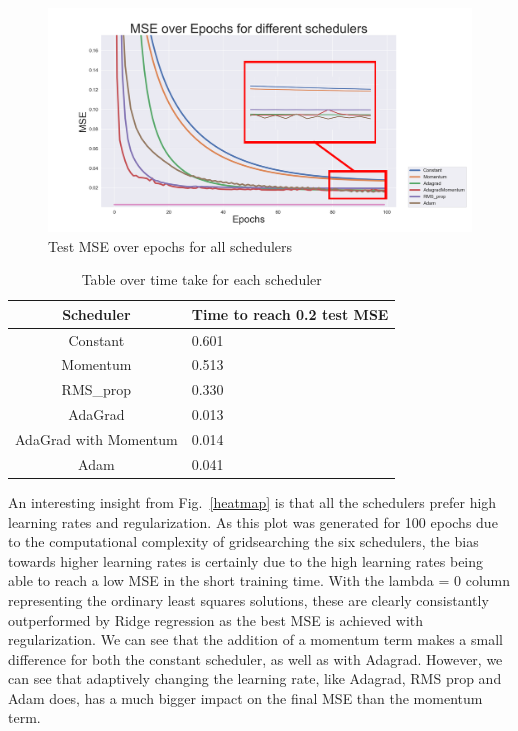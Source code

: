 \documentclass[onecolumn,10pt,cleanfoot]{asme2ej}
\begin{document}
\begin{figure}[H]
\centerline{\includegraphics[width=7in]{figure/new_adam_v_adagrad.png}}
\caption{Test MSE over epochs for all schedulers}
\label{figall}
\end{figure}

\begin{table}[H]
\caption{Table over time take for each scheduler}
\begin{center}
\label{timetable}
\begin{tabular}{| c | l |}
\hline
Scheduler & Time to reach 0.2 test MSE \\
\hline
Constant & 0.601 \\
Momentum & 0.513 \\
RMS\_prop & 0.330 \\
AdaGrad & 0.013 \\
AdaGrad with Momentum & 0.014 \\
Adam & 0.041 \\
\hline
\end{tabular}
\end{center}
\end{table}

An interesting insight from Fig.~\ref{heatmap} is that all the schedulers prefer high learning rates and regularization. As this plot was generated for 100 epochs due to the computational complexity of gridsearching the six schedulers, the bias towards higher learning rates is certainly due to the high learning rates being able to reach a low MSE in the short training time. With the lambda = 0 column representing the ordinary least squares solutions, these are clearly consistantly outperformed by Ridge regression as the best MSE is achieved with regularization. We can see that the addition of a momentum term makes a small difference for both the constant scheduler, as well as with Adagrad. However, we can see that adaptively changing the learning rate, like Adagrad, RMS prop and Adam does, has a much bigger impact on the final MSE than the momentum term.
\end{document}
